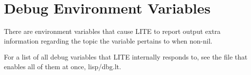 \documentclass[
letterpaper,
oneside,
]{memoir}
\begin{document}
\section{Debug Environment Variables}

There are environment variables that cause LITE to report output extra information regarding the topic the variable pertains to when non-nil.

\vspace{1em}
\noindent
For a list of all debug variables that LITE internally responds to, see the file that enables all of them at once, lisp/dbg.lt.
\end{document}
